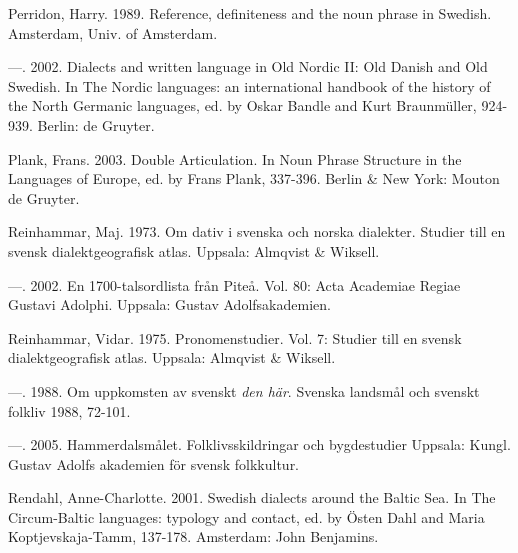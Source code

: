 Perridon, Harry. 1989. Reference, definiteness and the noun phrase in Swedish. Amsterdam, Univ. of Amsterdam.


—. 2002. Dialects and written language in Old Nordic II: Old Danish and Old Swedish. In The Nordic languages: an international handbook of the history of the North Germanic languages, ed. by Oskar Bandle and Kurt Braunmüller, 924-939. Berlin: de Gruyter.


Plank, Frans. 2003. Double Articulation. In Noun Phrase Structure in the Languages of Europe, ed. by Frans Plank, 337-396. Berlin \& New York: Mouton de Gruyter.


Reinhammar, Maj. 1973. Om dativ i svenska och norska dialekter. Studier till en svensk dialektgeografisk atlas. Uppsala: Almqvist \& Wiksell.


—. 2002. En 1700-talsordlista från Piteå. Vol. 80: Acta Academiae Regiae Gustavi Adolphi. Uppsala: Gustav Adolfsakademien.


Reinhammar, Vidar. 1975. Pronomenstudier. Vol. 7: Studier till en svensk dialektgeografisk atlas. Uppsala: Almqvist \& Wiksell.


—. 1988. Om uppkomsten av svenskt \textit{den här}. Svenska landsmål och svenskt folkliv 1988, 72-101.


—. 2005. Hammerdalsmålet. Folklivsskildringar och bygdestudier Uppsala: Kungl. Gustav Adolfs akademien för svensk folkkultur.


Rendahl, Anne-Charlotte. 2001. Swedish dialects around the Baltic Sea. In The Circum-Baltic languages: typology and contact, ed. by Östen Dahl and Maria Koptjevskaja-Tamm, 137-178. Amsterdam: John Benjamins.


